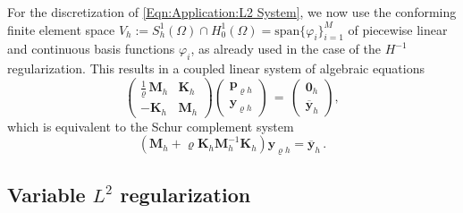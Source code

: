 \documentclass{article}
\numberwithin{equation}{section}
\begin{document}
For the discretization of \eqref{Eqn:Application:L2 System}, 
we now use the conforming
finite element space $V_h := S_h^1(\Omega) \cap H^1_0(\Omega)
= \mbox{span} \{ \varphi_i \}_{i=1}^M$ of piecewise linear and continuous
basis functions $\varphi_i$, as already used in the case of the $H^{-1}$
regularization. This results in a coupled linear system of
algebraic equations  
%
\[
  \left(
    \begin{array}{cc}
      \frac{1}{\varrho} \, \mathbf{M}_h & \mathbf{K}_h \\[1mm]
      -\mathbf{K}_h & \mathbf{M}_h
    \end{array}
  \right)
  \left(
    \begin{array}{c}
       \mathbf{p}_{\varrho h} \\[1mm]
       \mathbf{y}_{\varrho h}
    \end{array}
  \right)
  \, = \,
  \left(
    \begin{array}{c}
      \mathbf{0}_h \\[1mm]
      \overline{\mathbf{y}}_h
    \end{array} \right) ,
\]
which is equivalent to the Schur complement system
\[
  ( \mathbf{M}_h + \varrho \mathbf{K}_h \mathbf{M}_h^{-1} \mathbf{K}_h) %
  \mathbf{y}_{\varrho h} = \overline{\mathbf{y}}_h \, .
\]
%
%
\subsection{Variable $L^2$ regularization}
\end{document}
